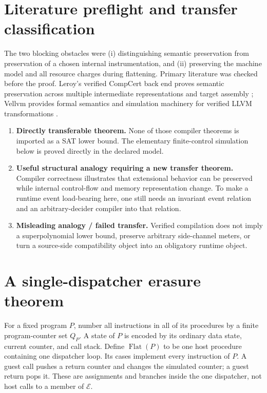 \documentclass[11pt]{article}
\begin{document}
\section{Literature preflight and transfer classification}
The two blocking obstacles were (i) distinguishing semantic preservation from
preservation of a chosen internal instrumentation, and (ii) preserving the
machine model and all resource charges during flattening.  Primary literature
was checked before the proof.  Leroy's verified CompCert back end proves
semantic preservation across multiple intermediate representations and target
assembly \cite{Leroy2009}; Vellvm provides formal semantics and simulation
machinery for verified LLVM transformations \cite{Zhao2012,Zakowski2021}.

\begin{enumerate}[leftmargin=1.5em]
\item \textbf{Directly transferable theorem.}  None of those compiler theorems
is imported as a SAT lower bound.  The elementary finite-control simulation
below is proved directly in the declared model.
\item \textbf{Useful structural analogy requiring a new transfer theorem.}
Compiler correctness illustrates that extensional behavior can be preserved
while internal control-flow and memory representation change.  To make a
runtime event load-bearing here, one still needs an invariant event relation
and an arbitrary-decider compiler into that relation.
\item \textbf{Misleading analogy / failed transfer.}  Verified compilation
does not imply a superpolynomial lower bound, preserve arbitrary side-channel
meters, or turn a source-side compatibility object into an obligatory runtime
object.
\end{enumerate}

\section{A single-dispatcher erasure theorem}
For a fixed program $P$, number all instructions in all of its procedures by a
finite program-counter set $Q_P$.  A state of $P$ is encoded by its ordinary
data state, current counter, and call stack.  Define $\operatorname{Flat}(P)$
to be one host procedure containing one dispatcher loop.  Its cases implement
every instruction of $P$.  A guest call pushes a return counter and changes the
simulated counter; a guest return pops it.  These are assignments and branches
inside the one dispatcher, not host calls to a member of $\mathcal E$.
\end{document}
